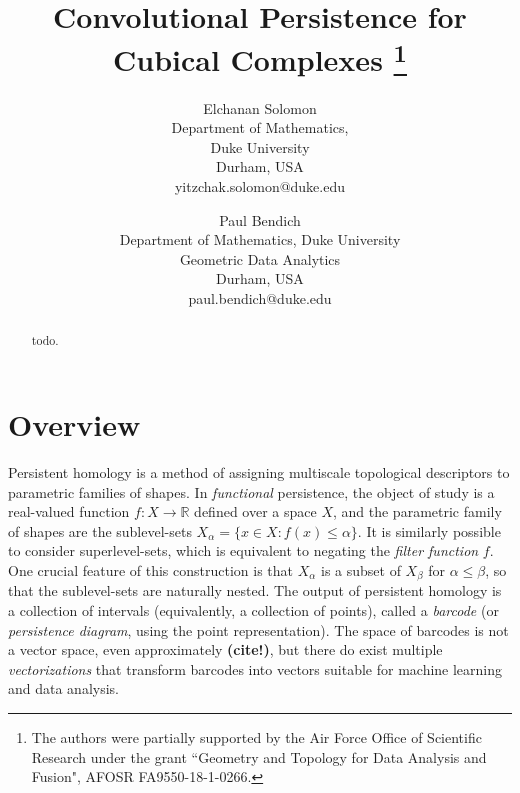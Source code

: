 \documentclass[conference]{IEEEtran}
\theoremstyle{definition}
\numberwithin{figure}{section}
\begin{document}
	
	
	\title{Convolutional Persistence for Cubical Complexes
		\thanks{The  authors were partially supported by the Air Force Office of Scientific Research under the  grant ``Geometry and Topology for Data Analysis and Fusion",  AFOSR FA9550-18-1-0266.}
	}
	
	\author{
		Elchanan Solomon\\
		Department of Mathematics, \\
		Duke University\\
		Durham, USA \\
		yitzchak.solomon@duke.edu
		\and
		Paul Bendich\\
		Department of Mathematics, Duke University\\
		Geometric Data Analytics\\
		Durham, USA \\
		paul.bendich@duke.edu
	}
	
	\maketitle
	
	\begin{abstract}
		todo.
	\end{abstract}
	
\section{Overview}
Persistent homology is a method of assigning multiscale topological descriptors to parametric families of shapes. In \emph{functional} persistence, the object of study is a real-valued function $f:X \to \mathbb{R}$ defined over a space $X$, and the parametric family of shapes are the sublevel-sets $X_{\alpha} = \{x \in X : f(x) \leq \alpha\}$. It is similarly possible to consider superlevel-sets, which is equivalent to negating the \emph{filter function} $f$. One crucial feature of this construction is that $X_{\alpha}$ is a subset of $X_{\beta}$ for $\alpha \leq \beta$, so that the sublevel-sets are naturally nested. The output of persistent homology is a collection of intervals (equivalently, a collection of points), called a \emph{barcode} (or \emph{persistence diagram}, using the point representation). The space of barcodes is not a vector space, even approximately {\bf (cite!)}, but there do exist multiple \emph{vectorizations} that transform barcodes into vectors suitable for machine learning and data analysis.\\
\end{document}

